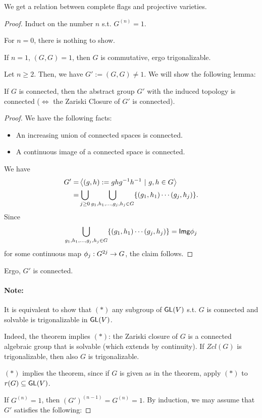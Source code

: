 We get a relation between complete flags and projective varieties.
\begin{proof}
Induct on the number $n$ s.t. $G^{(n)} = 1$.

For $n=0$, there is nothing to show.

If $n = 1$, $(G,G) = 1$, then $G$ is commutative, ergo trigonalizable.

Let $n \geq 2$. Then, we have $G' := (G,G) \neq 1$. We will show the following lemma:
\begin{lemma}
	If $G$ is connected, then the abstract group $G'$ with the induced topology is connected ($\iff$ the Zariski Closure of $G'$ is connected).
\end{lemma}
\begin{proof}
We have the following facts:
\begin{itemize}
	\item An increasing union of connected spaces is connected.
	\item A continuous image of a connected space is connected.
\end{itemize}
We have
\begin{align*}
G' =& \left<(g,h):= ghg^{-1} h^{-1} ~|~ g,h\in G \right>\\
=& \bigcup_{j \geq 0} \bigcup_{g_1,h_1, \ldots, g_j, h_j \in G} \{(g_1, h_1)\cdots (g_j, h_j)\}.
\end{align*}
Since
\[\bigcup_{g_1,h_1, \ldots, g_j, h_j \in G} \{(g_1, h_1)\cdots (g_j, h_j)\} = \textsf{Img} \phi_j\]
for some continuous map $\phi_j : G^{2j} \overset{}{\rightarrow} G$, the claim follows.
\end{proof}
Ergo, $G'$ is connected.

\paragraph{Note:} It is equivalent to show that $(*)$ any subgroup of $\textsf{GL}(V)$ s.t. $G$ is connected and solvable is trigonalizable in $\textsf{GL}(V)$.

Indeed, the theorem implies $(*)$: the Zariski closure of $G$ is a connected algebraic group that is solvable (which extends by continuity).
If $Zcl(G)$ is trigonalizable, then also $G$ is trigonalizable.

$(*)$ implies the theorem, since if $G$ is given as in the theorem, apply $(*)$ to $r(G) \subseteq \textsf{GL}(V)$.



If $G^{(n)} = 1$, then $(G')^{(n-1)} = G^{(n)} = 1$. By induction, we may assume that $G'$ satisfies the following:


\end{proof}
